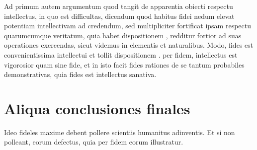 \documentclass[twoside, openright]{report}
\begin{document}
\pstart
{}
Ad primum autem argumentum quod tangit de apparentia obiecti respectu intellectus, in quo est difficultas, dicendum  quod habitus fidei nedum elevat potentiam intellectivam  
ad credendum, sed multipliciter fortificat ipsam respectu quarumcumque veritatum, quia  habet dispositionem , redditur fortior ad suas operationes exercendas, sicut videmus in elementis et  naturalibus. Modo, fides est convenientissima intellectui et tollit dispositionem .  per fidem, intellectus est vigorosior quam sine fide, et in isto facit fides rationes de se tantum probabiles  demonstrativas, quia fides est intellectus sanativa.
\pend

\bigskip
\section*{\textlangle{}Aliqua conclusiones finales\textrangle{}} 
\pstart
{}
Ideo  fideles maxime debent pollere scientiis humanitus adinventis. Et si non polleant,  eorum defectus, quia per fidem eorum  illustratur.
\pend
\end{document}

